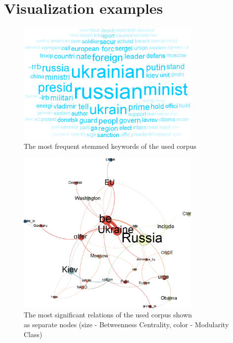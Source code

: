 \documentclass[]{article}
\begin{document}
\clearpage
\appendix
\appendixpage

%
\section{Visualization examples}
%
\begin{figure}[htbp]
  \centering
    \includegraphics[width=0.8\textwidth]{images/Cloud}
    \caption{The most frequent stemmed keywords of the used corpus}
  \label{Cloud}
\end{figure}
\begin{figure}[htbp]
  \centering
    \includegraphics[width=0.8\textwidth]{images/AllRelations}
    \captionsetup{justification=centering}
    \caption{The most significant relations of the used corpus shown \\ as separate nodes (size - Betweenness Centrality, color - Modularity Class)}
  \label{AllRelations}
\end{figure}
\end{document}

